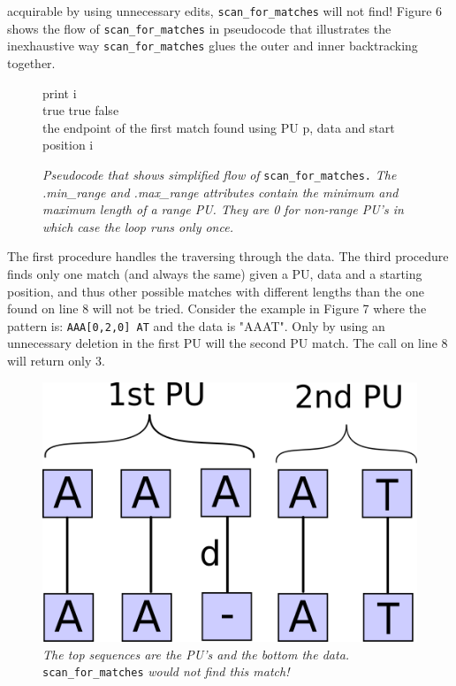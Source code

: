 \documentclass[12pt]{article}
\newcommand{\scm}{\texttt{scan\_for\_matches} }
\newcommand{\scmp}{\texttt{scan\_for\_matches.} }
\newcommand{\pu}{PU }
\newcommand{\pus}{PU's }
\newcommand{\pup}{PU. }
\begin{document}
acquirable by using unnecessary edits, \scm will not find!
Figure 6 shows the flow of \scm in pseudocode that illustrates the 
inexhaustive way \scm glues the outer and inner backtracking together.
\begin{figure}[H]
\begin{center}
\begin{algorithmic}[1]
        \State print i
      \EndIf
    \EndFor
  \EndProcedure \\
  	  \State \Return true
  	\EndIf
          \State \Return true
	    \EndIf
	  \EndIf
    \EndFor
    \State \Return false
  \EndProcedure \\
    \State \Return the endpoint of the first match found using PU p, data and start position i
  \EndProcedure
\end{algorithmic}
\end{center}
\caption{\textit{Pseudocode that shows simplified flow of} \scmp \textit{The .min\_range and .max\_range attributes
contain the minimum and maximum length of a range \pup They are 0 for non-range PU's in which case the loop runs
only once.}}
\end{figure}
\noindent The first procedure handles the traversing through the data. The third procedure finds only one match (and always 
the same) given a PU, data and a starting position, and thus other possible matches with different lengths than the
one found on line 8 will not be tried. Consider the example in Figure 7 where
the pattern is: \texttt{AAA[0,2,0] AT} and the data is "AAAT". Only by using an unnecessary deletion in the first
\pu will the second \pu match. The call on line 8 will return only 3.
\begin{figure}[H]
\begin{center}
\includegraphics[scale=0.3]{Diagrams/scnfail.png}
\end{center}
\caption{\textit{The top sequences are the \pus and the bottom the data.} \scm \textit{would not find this match!}}
\end{figure}
\end{document}

